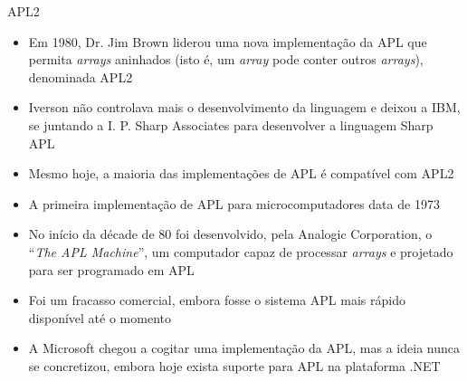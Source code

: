 \begin{frame}[fragile]{APL2}

    \begin{itemize}
        \item Em 1980, Dr. Jim Brown liderou uma nova implementação da APL que permita \textit{arrays} aninhados (isto é, um \textit{array} pode conter outros \textit{arrays}), denominada APL2

        \item Iverson não controlava mais o desenvolvimento da linguagem e deixou a IBM, se juntando a I. P. Sharp Associates para desenvolver a linguagem Sharp APL

        \item Mesmo hoje, a maioria das implementações de APL é compatível com APL2

        \item A primeira implementação de APL para microcomputadores data de 1973

        \item No início da décade de 80 foi desenvolvido, pela Analogic Corporation, o ``\textit{The APL Machine}'', um computador capaz de processar \textit{arrays} e projetado para ser programado em APL

        \item  Foi um fracasso comercial, embora fosse o sistema APL mais rápido disponível até o momento
        \item A Microsoft chegou a cogitar uma implementação da APL, mas a ideia nunca se concretizou, embora hoje exista suporte para APL na plataforma .NET
    \end{itemize}

\end{frame}

